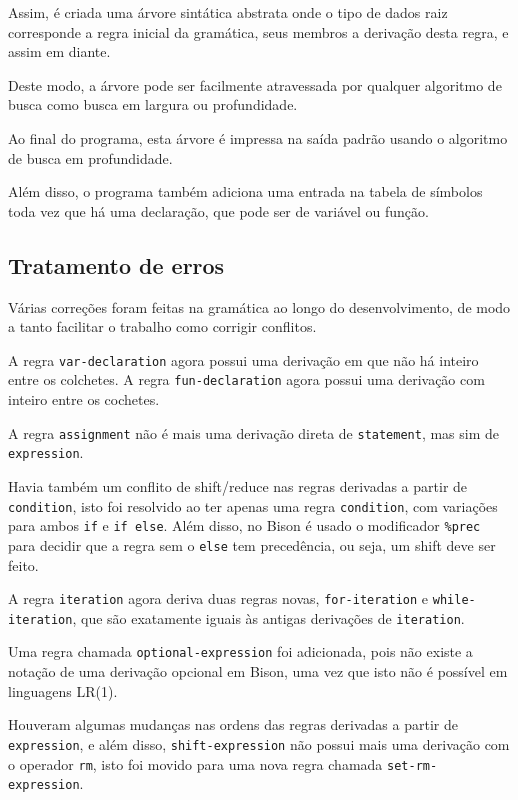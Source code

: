 \documentclass[
	article,			%
	11pt,				%
	oneside,			%
	a4paper,			%
	english,			%
	brazil,				%
	sumario=tradicional
	]{abntex2}
\begin{document}
Assim, é criada uma árvore sintática abstrata onde o tipo de dados raiz corresponde a regra inicial da gramática, seus membros a derivação desta regra, e assim em diante.

Deste modo, a árvore pode ser facilmente atravessada por qualquer algoritmo de busca como busca em largura ou profundidade. 

Ao final do programa, esta árvore é impressa na saída padrão usando o algoritmo de busca em profundidade.

Além disso, o programa também adiciona uma entrada na tabela de símbolos toda vez que há uma declaração, que pode ser de variável ou função.

\subsection{Tratamento de erros}

Várias correções foram feitas na gramática ao longo do desenvolvimento, de modo a tanto facilitar o trabalho como corrigir conflitos.

A regra \texttt{var-declaration} agora possui uma derivação em que não há inteiro entre os colchetes. A regra \texttt{fun-declaration} agora possui uma derivação com inteiro entre os cochetes.

A regra \texttt{assignment} não é mais uma derivação direta de \texttt{statement}, mas sim de \texttt{expression}.

Havia também um conflito de shift/reduce nas regras derivadas a partir de \texttt{condition}, isto foi resolvido ao ter apenas uma regra \texttt{condition}, com variações para ambos \texttt{if} e \texttt{if else}. Além disso, no Bison é usado o modificador \texttt{\%prec} para decidir que a regra sem o \texttt{else} tem precedência, ou seja, um shift deve ser feito.

A regra \texttt{iteration} agora deriva duas regras novas, \texttt{for-iteration} e \texttt{while-iteration}, que são exatamente iguais às antigas derivações de \texttt{iteration}.

Uma regra chamada \texttt{optional-expression} foi adicionada, pois não existe a notação de uma derivação opcional em Bison, uma vez que isto não é possível em linguagens LR(1).

Houveram algumas mudanças nas ordens das regras derivadas a partir de \texttt{expression}, e além disso, \texttt{shift-expression} não possui mais uma derivação com o operador \texttt{rm}, isto foi movido para uma nova regra chamada \texttt{set-rm-expression}.
\end{document}
